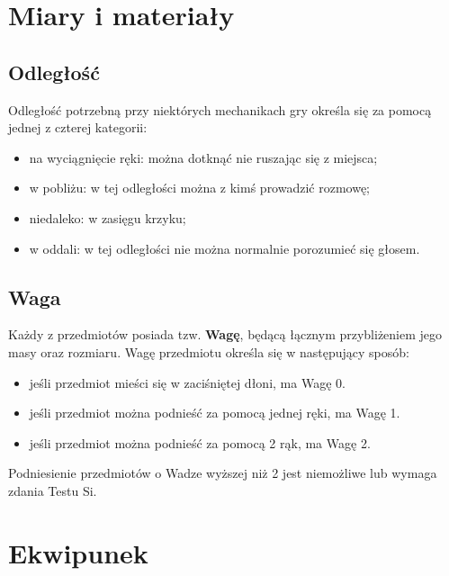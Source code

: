 \documentclass[10pt,a4paper]{book}
\begin{document}
\section{Miary i materiały}
\begin{multicols}{2}

\subsection*{Odległość}
Odległość potrzebną przy niektórych mechanikach gry określa się za pomocą jednej z czterej kategorii:
\begin{itemize}
	\item na wyciągnięcie ręki: można dotknąć nie ruszając się z miejsca;
	\item w pobliżu: w tej odległości można z kimś prowadzić rozmowę;
	\item niedaleko: w zasięgu krzyku;
	\item w oddali: w tej odległości nie można normalnie porozumieć się głosem.
\end{itemize}


\subsection*{Waga}
Każdy z przedmiotów posiada tzw. \textbf{Wagę}, będącą łącznym przybliżeniem jego masy oraz rozmiaru. Wagę przedmiotu określa się w następujący sposób:
\begin{itemize}
	\item jeśli przedmiot mieści się w zaciśniętej dłoni, ma Wagę 0.
	\item jeśli przedmiot można podnieść za pomocą jednej ręki, ma Wagę 1.
	\item jeśli przedmiot można podnieść za pomocą 2 rąk, ma Wagę 2.
\end{itemize}

Podniesienie przedmiotów o Wadze wyższej niż 2 jest niemożliwe lub wymaga zdania Testu Si.

\end{multicols}



\section{Ekwipunek}
\begin{multicols}{2}


\end{multicols}
\end{document}
